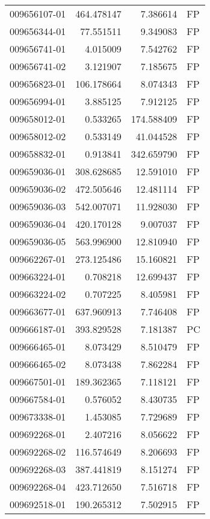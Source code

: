 \begin{tabular}{lrrl}
009656107-01 &  464.478147 &     7.386614 &   FP \\
009656344-01 &   77.551511 &     9.349083 &   FP \\
009656741-01 &    4.015009 &     7.542762 &   FP \\
009656741-02 &    3.121907 &     7.185675 &   FP \\
009656823-01 &  106.178664 &     8.074343 &   FP \\
009656994-01 &    3.885125 &     7.912125 &   FP \\
009658012-01 &    0.533265 &   174.588409 &   FP \\
009658012-02 &    0.533149 &    41.044528 &   FP \\
009658832-01 &    0.913841 &   342.659790 &   FP \\
009659036-01 &  308.628685 &    12.591010 &   FP \\
009659036-02 &  472.505646 &    12.481114 &   FP \\
009659036-03 &  542.007071 &    11.928030 &   FP \\
009659036-04 &  420.170128 &     9.007037 &   FP \\
009659036-05 &  563.996900 &    12.810940 &   FP \\
009662267-01 &  273.125486 &    15.160821 &   FP \\
009663224-01 &    0.708218 &    12.699437 &   FP \\
009663224-02 &    0.707225 &     8.405981 &   FP \\
009663677-01 &  637.960913 &     7.746408 &   FP \\
009666187-01 &  393.829528 &     7.181387 &   PC \\
009666465-01 &    8.073429 &     8.510479 &   FP \\
009666465-02 &    8.073438 &     7.862284 &   FP \\
009667501-01 &  189.362365 &     7.118121 &   FP \\
009667584-01 &    0.576052 &     8.430735 &   FP \\
009673338-01 &    1.453085 &     7.729689 &   FP \\
009692268-01 &    2.407216 &     8.056622 &   FP \\
009692268-02 &  116.574649 &     8.206693 &   FP \\
009692268-03 &  387.441819 &     8.151274 &   FP \\
009692268-04 &  423.712650 &     7.516718 &   FP \\
009692518-01 &  190.265312 &     7.502915 &   FP \\

\end{tabular}
